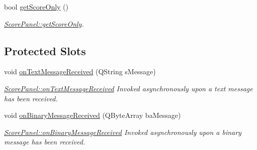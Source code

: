 \begin{DoxyCompactItemize}
bool \mbox{\hyperlink{classScorePanel_a2c2bba4095fa6ac83cb96913cc7dfd9f}{get\+Score\+Only}} ()
\begin{DoxyCompactList}\small\item\em \mbox{\hyperlink{classScorePanel_a2c2bba4095fa6ac83cb96913cc7dfd9f}{Score\+Panel\+::get\+Score\+Only}}. \end{DoxyCompactList}\end{DoxyCompactItemize}
\subsection*{Protected Slots}
\begin{DoxyCompactItemize}
\item 
void \mbox{\hyperlink{classScorePanel_af3d7aa48c21c4e63d398dac5a2266130}{on\+Text\+Message\+Received}} (Q\+String s\+Message)
\begin{DoxyCompactList}\small\item\em \mbox{\hyperlink{classScorePanel_af3d7aa48c21c4e63d398dac5a2266130}{Score\+Panel\+::on\+Text\+Message\+Received}} Invoked asynchronously upon a text message has been received. \end{DoxyCompactList}\item 
void \mbox{\hyperlink{classScorePanel_a2588d1e54b9c669ea352bab4215bef42}{on\+Binary\+Message\+Received}} (Q\+Byte\+Array ba\+Message)
\begin{DoxyCompactList}\small\item\em \mbox{\hyperlink{classScorePanel_a2588d1e54b9c669ea352bab4215bef42}{Score\+Panel\+::on\+Binary\+Message\+Received}} Invoked asynchronously upon a binary message has been received. \end{DoxyCompactList}\end{DoxyCompactItemize}
